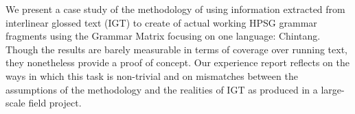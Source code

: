 We present a case study of the methodology of using information extracted from interlinear glossed text (IGT) to create of actual working HPSG grammar fragments using the Grammar Matrix focusing on one language: Chintang. Though the results are barely measurable in terms of coverage over running text, they nonetheless provide a proof of concept.  Our experience report reflects on the ways in which this task is non-trivial and on mismatches between the assumptions of the methodology and the realities of IGT as produced in a large-scale field project.
